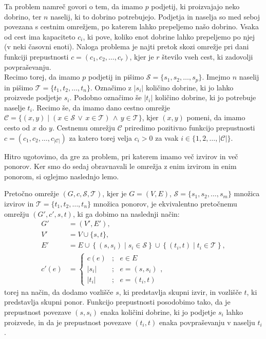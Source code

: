 \documentclass[mat1]{fmfdelo}
\begin{document}
Ta problem namreč govori o tem, da imamo $p$ podjetij, ki proizvajajo neko dobrino, ter $n$ naselij, ki to dobrino potrebujejo.
Podjetja in naselja so med seboj povezana s cestnim omrežjem, po katerem lahko prepeljemo našo dobrino. Vsaka od cest ima kapaciteto $c_i$,
ki pove, koliko enot dobrine lahko prepeljemo po njej (v neki časovni enoti). Naloga problema je najti pretok skozi omrežje pri dani funkciji
prepustnosti $c = (c_1, c_2, \dotsc, c_r)$, kjer je $r$ število vseh cest, ki zadovolji povpraševanju.\\

Recimo torej, da imamo $p$ podjetij in pišimo $\mathcal{S} = \{s_1, s_2, \dotsc, s_p\}$. Imejmo $n$ naselij in pišimo $\mathcal{T} = \{t_1, t_2, \dotsc, t_n\}$.
Označimo z $|s_i|$ količino dobrine, ki jo lahko proizvede podjetje $s_i$. Podobno označimo še $|t_i|$ količino dobrine, ki jo potrebuje naselje $t_i$.
Recimo še, da imamo dano cestno omrežje $\mathcal{C} = \{(x,y) \mid (x \in \mathcal{S} \,\vee\, x \in \mathcal{T}) \,\wedge\, y \in \mathcal{T}\}$, kjer $(x,y)$ pomeni,
da imamo cesto od $x$ do $y$. Cestnemu omrežju $\mathcal{C}$ priredimo pozitivno funkcijo prepustnosti
$c = (c_1, c_2, \dotsc, c_{|\mathcal{C}|})$ za katero torej velja $c_i > 0$ za vsak $i \in \{1, 2, \dotsc, |\mathcal{C}|\}$.

Hitro ugotovimo, da gre za problem, pri katerem imamo več izvirov in več ponorov. Ker smo do sedaj obravnavali le omrežja z enim izvirom in enim
ponorom, si oglejmo naslednjo lemo.

\begin{lema}
  Pretočno omrežje $(G, c, \mathcal{S}, \mathcal{T})$, kjer je $G = (V,E)$, $\mathcal{S} = \{s_1, s_2, \dotsc, s_m\}$ množica izvirov in $\mathcal{T} = \{t_1, t_2, \dotsc, t_n\}$ množica ponorov,
  je ekvivalentno pretočnemu omrežju $(G', c', s, t)$, ki ga dobimo na naslednji način:
  \begin{align*}
    G' &= (V', E'),\\
    V' &= V \cup \{s, t\},\\
    E' &= E \cup \left\{(s, s_i) \mid s_i \in \mathcal{S}\right\} \cup \left\{(t_i, t) \mid t_i \in \mathcal{T}\right\},\\
    c'(e) &= \begin{cases} c(e) &;~~~ e \in E\\ |s_i| &;~~~ e = (s, s_i)\\ |t_i| &;~~~ e = (t_i, t) \end{cases},
  \end{align*}
  torej na način, da dodamo vozlišče $s$, ki predstavlja skupni izvir, in vozlišče $t$, ki predstavlja skupni ponor. Funkcijo prepustnosti posodobimo tako,
  da je prepustnost povezave $(s, s_i)$ enaka količini dobrine, ki jo podjetje $s_i$ lahko proizvede, in da je prepustnost povezave $(t_i, t)$ enaka povpraševanju v
  naselju $t_i$.
\end{lema}
\end{document}
